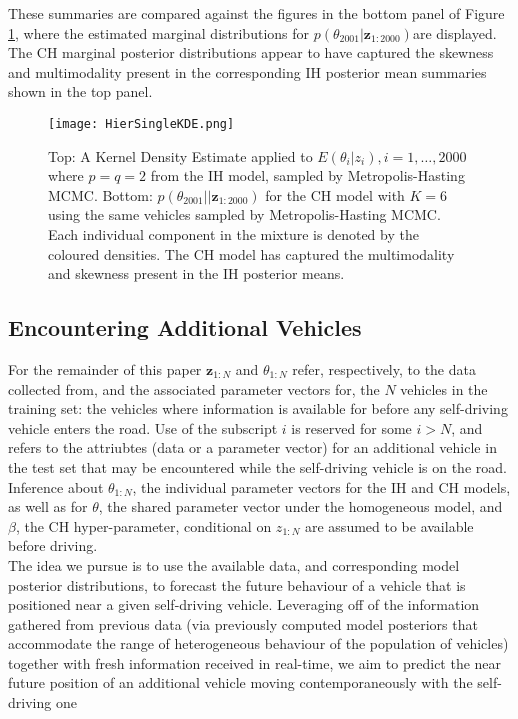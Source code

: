 \documentclass[12pt,a4paper]{article}\usepackage[]{graphicx}\usepackage[]{color}
\begin{document}
These summaries are compared against the figures in the bottom panel of Figure \ref{fig:HierSingleKDE}, where the estimated marginal distributions for $p(\theta_{2001} | \textbf{z}_{1:2000})$are displayed. The CH marginal posterior distributions appear to have captured the skewness and multimodality present in the corresponding IH posterior mean summaries shown in the top panel. 
\begin{figure}[ht]
\centering
\texttt{[image: HierSingleKDE.png]}
\caption{Top: A Kernel Density Estimate applied to $E(\theta_i | z_i), i = 1, \dots, 2000$ where $p = q = 2$ from the IH model, sampled by Metropolis-Hasting MCMC. Bottom: $p(\theta_{2001}| | \textbf{z}_{1:2000})$ for the CH model with $K = 6$ using the same vehicles sampled by Metropolis-Hasting MCMC. Each individual component in the mixture is denoted by the coloured densities. The CH model has captured the multimodality and skewness present in the IH posterior means.}
\label{fig:HierSingleKDE}
\end{figure}

\subsection{Encountering Additional Vehicles}
\label{subsec:additionalVehicles}

For the remainder of this paper $\textbf{z}_{1:N}$ and $\theta_{1:N}$ refer, respectively, to the data collected from, and the associated parameter vectors for, the $N$ vehicles in the training set: the vehicles where information is available for before any self-driving vehicle enters the road. Use of the subscript $i$ is reserved for some $i > N$, and refers to the attriubtes (data or a parameter vector) for an additional vehicle in the test set that may be encountered while the self-driving vehicle is on the road. Inference about $\theta_{1:N}$, the individual parameter vectors for the IH and CH models, as well as for $\theta$, the shared parameter vector under the homogeneous model, and $\beta$, the CH hyper-parameter, conditional on $z_{1:N}$ are assumed to be available before driving.
\\

The idea we pursue is to use the available data, and corresponding model posterior distributions, to forecast the future behaviour of a vehicle that is positioned near a given self-driving vehicle. Leveraging off of the information gathered from previous data (via previously computed model posteriors that accommodate the range of heterogeneous behaviour of the population of vehicles) together with fresh information received in real-time, we aim to predict the near future position of an additional vehicle moving contemporaneously with the self-driving one
\\
\end{document}
